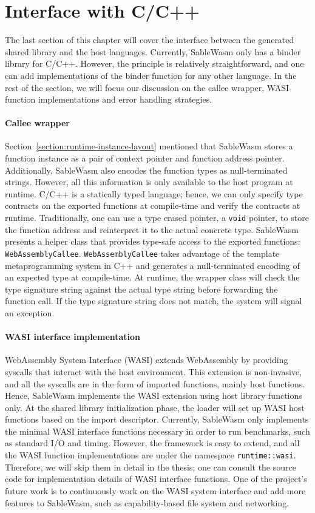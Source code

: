 \section{Interface with C/C++}
\label{section:runtime-host-lang}

The last section of this chapter will cover the interface between the generated
shared library and the host languages. Currently, SableWasm only has a binder
library for C/C++. However, the principle is relatively straightforward, and
one can add implementations of the binder function for any other language. In
the rest of the section, we will focus our discussion on the callee wrapper,
WASI function implementations and error handling strategies.

\paragraph{Callee wrapper}
Section~\ref{section:runtime-instance-layout} mentioned that SableWasm stores a
function instance as a pair of
context pointer and function address pointer. Additionally, SableWasm also
encodes the function types as null-terminated strings. However, all this
information is only available to the host program at runtime. C/C++ is a
statically typed language; hence, we can only specify type contracts on the
exported functions at compile-time and verify the contracts at runtime.
Traditionally, one can use a type erased pointer, a \texttt{void} pointer,
to store the function address and reinterpret it to the actual concrete type.
SableWasm presents a helper class that provides type-safe access to the
exported functions: \texttt{WebAssemblyCallee}. \texttt{WebAssemblyCallee} takes
advantage of the template metaprogramming system in C++ and generates
a null-terminated encoding of an expected type at compile-time. At runtime,
the wrapper class will check the type signature string against the actual type
string before forwarding the function call. If the type signature string does
not match, the system will signal an exception.

\paragraph{WASI interface implementation}
WebAssembly System Interface (WASI) extends WebAssembly by providing syscalls
that interact with the host environment. This extension is non-invasive, and
all the syscalls are in the form of imported functions, mainly host
functions. Hence, SableWasm implements the WASI extension using host library
functions only. At the shared library initialization phase, the loader will set
up WASI host functions based on the import descriptor. Currently, SableWasm only
implements the minimal WASI interface functions necessary in order to run
benchmarks, such as standard I/O and timing. However, the framework is easy to
extend, and all the WASI function implementations are under the namespace
\texttt{runtime::wasi}. Therefore, we will skip them in detail in the thesis;
one can consult the source code for implementation details of WASI interface
functions. One of the project's future work is to continuously work on the
WASI system interface and add more features to SableWasm, such as
capability-based file system and networking.

